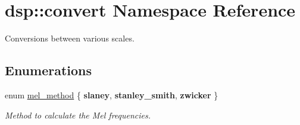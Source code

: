 \hypertarget{namespacedsp_1_1convert}{}\section{dsp\+:\+:convert Namespace Reference}
\label{namespacedsp_1_1convert}


Conversions between various scales.  


\subsection*{Enumerations}
\begin{DoxyCompactItemize}
\item 
\mbox{\label{namespacedsp_1_1convert_a597c04e9527c14c1280a917016852b59}} 
enum \mbox{\hyperlink{namespacedsp_1_1convert_a597c04e9527c14c1280a917016852b59}{mel\+\_\+method}} \{ {\bfseries slaney}, 
{\bfseries stanley\+\_\+smith}, 
{\bfseries zwicker}
 \}
\begin{DoxyCompactList}\small\item\em Method to calculate the Mel frequencies. \end{DoxyCompactList}\end{DoxyCompactItemize}

